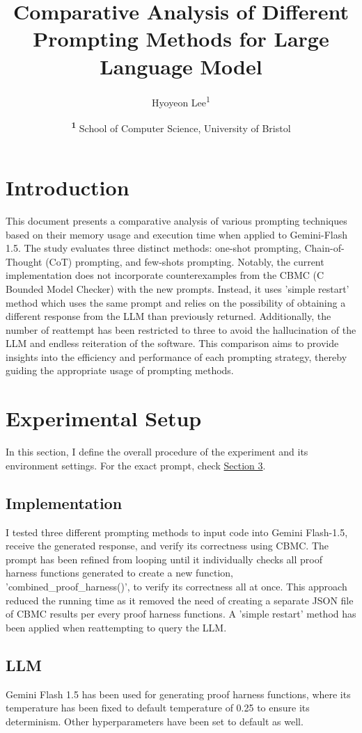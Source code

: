 \documentclass[onecolumn]{NobArticle}
\title{Comparative Analysis of Different Prompting Methods for Large Language Model}
\author{
    Hyoyeon Lee\textsuperscript{1}
}
\date{
    \textsuperscript{\textbf{1}}
    School of Computer Science, University of Bristol
}
\begin{document}
\small
\maketitle
\section{Introduction}
This document presents a comparative analysis of various prompting techniques based on their memory usage and execution time when applied to Gemini-Flash 1.5. The study evaluates three distinct methods: one-shot prompting, Chain-of-Thought (CoT) prompting, and few-shots prompting. Notably, the current implementation does not incorporate counterexamples from the CBMC (C Bounded Model Checker) with the new prompts. Instead, it uses 'simple restart' method which uses the same prompt and relies on the possibility of obtaining a different response from the LLM than previously returned. Additionally, the number of reattempt has been restricted to three to avoid the hallucination of the LLM and endless reiteration of the software. This comparison aims to provide insights into the efficiency and performance of each prompting strategy, thereby guiding the appropriate usage of prompting methods.

\vspace{11pt}
\section{Experimental Setup}
In this section, I define the overall procedure of the experiment and its environment settings. For the exact prompt, check \hyperref[sec:prompting_methods]{Section 3}.

\subsection{Implementation}
I tested three different prompting methods to input code into Gemini Flash-1.5, receive the generated response, and verify its correctness using CBMC. The prompt has been refined from looping until it individually checks all proof harness functions generated to create a new function, 'combined\_proof\_harness()', to verify its correctness all at once. This approach reduced the running time as it removed the need of creating a separate JSON file of CBMC results per every proof harness functions. A 'simple restart' method has been applied when reattempting to query the LLM.

\subsection{LLM}
Gemini Flash 1.5 has been used for generating proof harness functions, where its temperature has been fixed to default temperature of 0.25 to ensure its determinism. Other hyperparameters have been set to default as well.
\end{document}
